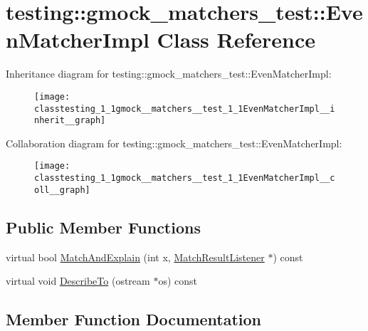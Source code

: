 \hypertarget{classtesting_1_1gmock__matchers__test_1_1EvenMatcherImpl}{}\section{testing\+:\+:gmock\+\_\+matchers\+\_\+test\+:\+:Even\+Matcher\+Impl Class Reference}
\label{classtesting_1_1gmock__matchers__test_1_1EvenMatcherImpl}


Inheritance diagram for testing\+:\+:gmock\+\_\+matchers\+\_\+test\+:\+:Even\+Matcher\+Impl\+:
\nopagebreak
\begin{figure}[H]
\begin{center}
\leavevmode
\texttt{[image: classtesting\_1\_1gmock\_\_matchers\_\_test\_1\_1EvenMatcherImpl\_\_inherit\_\_graph]}
\end{center}
\end{figure}


Collaboration diagram for testing\+:\+:gmock\+\_\+matchers\+\_\+test\+:\+:Even\+Matcher\+Impl\+:
\nopagebreak
\begin{figure}[H]
\begin{center}
\leavevmode
\texttt{[image: classtesting\_1\_1gmock\_\_matchers\_\_test\_1\_1EvenMatcherImpl\_\_coll\_\_graph]}
\end{center}
\end{figure}
\subsection*{Public Member Functions}
\begin{DoxyCompactItemize}
\item 
virtual bool \hyperlink{classtesting_1_1gmock__matchers__test_1_1EvenMatcherImpl_a91bd69693562946f5a11157ae1cc0e5c}{Match\+And\+Explain} (int x, \hyperlink{classtesting_1_1MatchResultListener}{Match\+Result\+Listener} $\ast$) const 
\item 
virtual void \hyperlink{classtesting_1_1gmock__matchers__test_1_1EvenMatcherImpl_aa29ca9bfd5c704cba3bde3a1997d74f8}{Describe\+To} (ostream $\ast$os) const 
\end{DoxyCompactItemize}


\subsection{Member Function Documentation}
